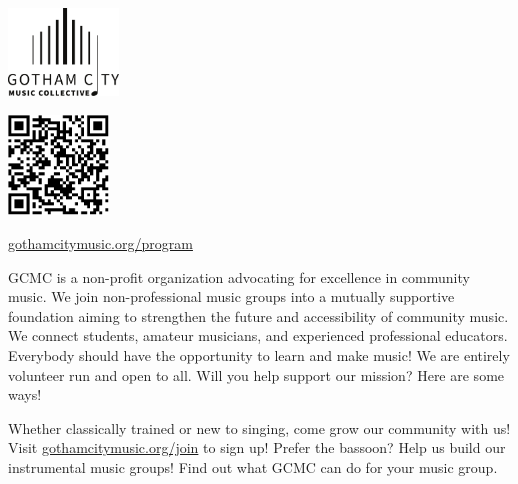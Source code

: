 \documentclass{article}[10pt]
\newcommand{\logo}{
        {\includegraphics[width=0.22\textwidth]{../graphic_design_assets/bw_logo_full}}
}
\newcommand{\tunedspace}{\vspace{0.15in}}
\begin{document}
    \pagebreak


    \begin{center}
    {\logo}

        \tunedspace

        \begin{minipage}{4in}

            \begin{center}
            {\textbf{}}

                \vspace{0.1in}

                {\includegraphics[width=0.2\textwidth]{../graphic_design_assets/gotham_city_music_collective_program.png}}

                \href{https://gothamcitymusic.org/program}{gothamcitymusic.org/program}
            \end{center}

            \begin{small}
                GCMC is a non-profit organization advocating for excellence in community music.
                We join non-professional music groups into a mutually supportive foundation aiming
                to strengthen the future and accessibility of community music.
                We connect students, amateur musicians, and experienced professional educators.
                Everybody should have the opportunity to learn and make music!
                We are entirely volunteer run and open to all.
                Will you help support our mission?
                Here are some ways!
            \end{small}

            \begin{center}
            {\textbf{}}
            \end{center}

            \vspace{-0.1in}

            \begin{small}
                Whether classically trained or new to singing, come grow our community with us!
                Visit {\href{gothamcitymusic.org/join}{gothamcitymusic.org/join}} to sign up!
                Prefer the bassoon?
                Help us build our instrumental music groups!
                Find out what GCMC can do for your music group.
            \end{small}


\end{minipage}
\end{center}
\end{document}
